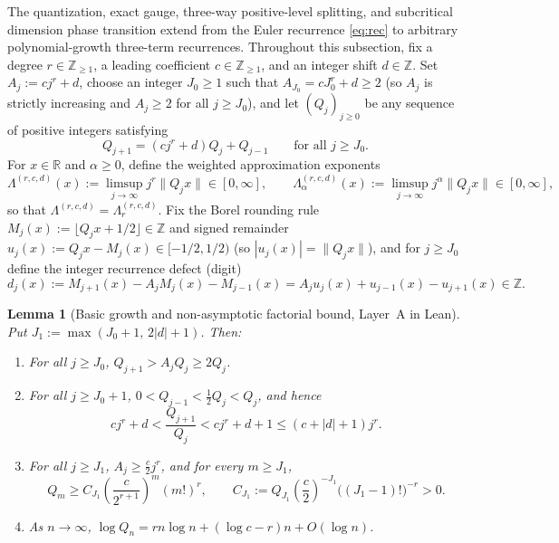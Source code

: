 \documentclass[11pt]{article}
\newtheorem{lemma}[theorem]{Lemma}
\theoremstyle{definition}
\theoremstyle{remark}
\newcommand{\R}{\mathbb{R}}
\newcommand{\Z}{\mathbb{Z}}
\newcommand{\Lam}{\Lambda}
\begin{document}
The quantization, exact gauge, three-way positive-level splitting, and
subcritical dimension phase transition extend from the Euler recurrence
\eqref{eq:rec} to arbitrary polynomial-growth three-term recurrences. Throughout
this subsection, fix a degree $r\in\Z_{\ge1}$, a leading coefficient
$c\in\Z_{\ge1}$, and an integer shift $d\in\Z$. Set $A_j:=cj^r+d$, choose an
integer $J_0\ge1$ such that $A_{J_0}=cJ_0^r+d\ge2$ (so $A_j$ is strictly
increasing and $A_j\ge2$ for all $j\ge J_0$), and let $(Q_j)_{j\ge0}$ be any
sequence of positive integers satisfying
\begin{equation}\label{eq:poly-rec}
Q_{j+1}=(cj^r+d)Q_j+Q_{j-1}\qquad\text{for all }j\ge J_0.
\end{equation}
For $x\in\R$ and $\alpha\ge0$, define the weighted approximation exponents
\[
\Lam^{(r,c,d)}(x):=\limsup_{j\to\infty}j^r\|Q_jx\|\in[0,\infty],\qquad
\Lam_\alpha^{(r,c,d)}(x):=\limsup_{j\to\infty}j^\alpha\|Q_jx\|\in[0,\infty],
\]
so that $\Lam^{(r,c,d)}=\Lam_r^{(r,c,d)}$. Fix the Borel rounding rule
$M_j(x):=\lfloor Q_jx+1/2\rfloor\in\Z$ and signed remainder
$u_j(x):=Q_jx-M_j(x)\in[-1/2,1/2)$ (so $|u_j(x)|=\|Q_jx\|$), and for $j\ge J_0$
define the integer recurrence defect (digit)
\begin{equation}\label{eq:poly-defect-id}
d_j(x):=M_{j+1}(x)-A_jM_j(x)-M_{j-1}(x)=A_ju_j(x)+u_{j-1}(x)-u_{j+1}(x)\in\Z.
\end{equation}

\begin{lemma}[Basic growth and non-asymptotic factorial bound, Layer~A in Lean]\label{lem:poly-growth}
Put $J_1:=\max(J_0+1,\,2|d|+1)$. Then:
\begin{enumerate}[label=(\roman*),leftmargin=2em]
\item For all $j\ge J_0$, $Q_{j+1}>A_jQ_j\ge2Q_j$.
\item For all $j\ge J_0+1$, $0<Q_{j-1}<\frac12Q_j<Q_j$, and hence
\[
cj^r+d<\frac{Q_{j+1}}{Q_j}<cj^r+d+1\le(c+|d|+1)j^r.
\]
\item For all $j\ge J_1$, $A_j\ge\frac{c}{2}j^r$, and for every $m\ge J_1$,
\[
Q_m\ge C_{J_1}\left(\frac{c}{2^{r+1}}\right)^m(m!)^r,\qquad
C_{J_1}:=Q_{J_1}\left(\frac{c}{2}\right)^{-J_1}\bigl((J_1-1)!\bigr)^{-r}>0.
\]
\item As $n\to\infty$, $\log Q_n=rn\log n+(\log c-r)n+O(\log n)$.
\end{enumerate}
\end{lemma}
\end{document}
